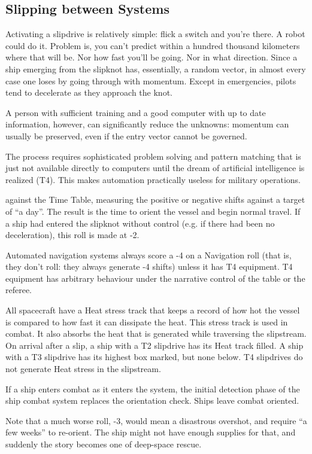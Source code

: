 \subsection{Slipping between Systems}\label{sec:slipping-between-systems} %

Activating a slipdrive is relatively simple: flick a switch and you're there. A robot could do it. Problem is, you can't predict within a hundred thousand kilometers where that will be. Nor how fast you'll be going. Nor in what direction. Since a ship emerging from the slipknot has, essentially, a random vector, in almost every case one loses by going through with momentum. Except in emergencies, pilots tend to decelerate as they approach the knot.

A person with sufficient training and a good computer with up to date information, however, can significantly reduce the unknowns: momentum can usually be preserved, even if the entry vector cannot be governed.

The process requires sophisticated problem solving and pattern matching that is just not available directly to computers until the dream of artificial intelligence is realized (T4). This makes automation practically useless for military operations.

against the Time Table, measuring the positive or negative shifts against a target of ``a day''. The result is the time to orient the vessel and begin normal travel. If a ship had entered the slipknot without control (e.g. if there had been no deceleration), this roll is made at -2.

Automated navigation systems always score a -4 on a Navigation roll (that is, they don't roll: they always generate -4 shifts) unless it has T4 equipment. T4 equipment has arbitrary behaviour under the narrative control of the table or the referee.

All spacecraft have a Heat stress track that keeps a record of how hot the vessel is compared to how fast it can dissipate the heat. This stress track is used in combat. It also absorbs the heat that is generated while traversing the slipstream. On arrival after a slip, a ship with a T2 slipdrive has its Heat track filled. A ship with a T3 slipdrive has its highest box marked, but none below. T4 slipdrives do not generate Heat stress in the slipstream.

If a ship enters combat as it enters the system, the initial detection phase of the ship combat system replaces the orientation check. Ships leave combat oriented.

Note that a much worse roll, -3, would mean a disastrous overshot, and require ``a few weeks'' to re-orient. The ship might not have enough supplies for that, and suddenly the story becomes one of deep-space rescue.

